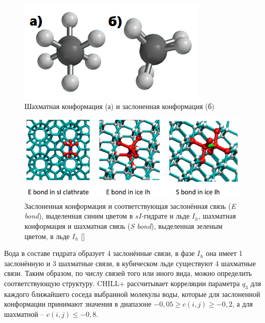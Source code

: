 \begin{figure}[H]
    \centering
    \includegraphics{figures/bonds.png}
    \caption{Шахматная конформация (а) и заслоненная конформация (б)}
    \label{fig2.11}
\end{figure}
\begin{figure}[H]
    \centering
    \includegraphics{figures/chillplus.png}
    \caption{Заслоненная конформация и соответствующая заслонённая связь (\textit{E bond}), выделенная синим цветом в $sI$-гидрате и льде $I_h$, шахматная конформация и шахматная связь (\textit{S bond}), выделенная зеленым цветом, в льде $I_h$ []}
    \label{fig2.12}
\end{figure}

Вода в составе гидрата образует 4 заслонённые связи, в фазе $I_h$ она имеет 1 заслонённую и 3 шахматные связи, в кубическом льде существуют 4 шахматные связи. Таким образом, по числу связей того или иного вида, можно определить соответствующую структуру. CHILL+ рассчитывает корреляции параметра $q_3$ для каждого ближайшего соседа выбранной молекулы воды, которые для заслоненной конформации принимают значения в диапазоне $-0,05\geq c(i,j) \geq -0,2$, а для шахматной -- $c(i,j)\leq -0,8$.